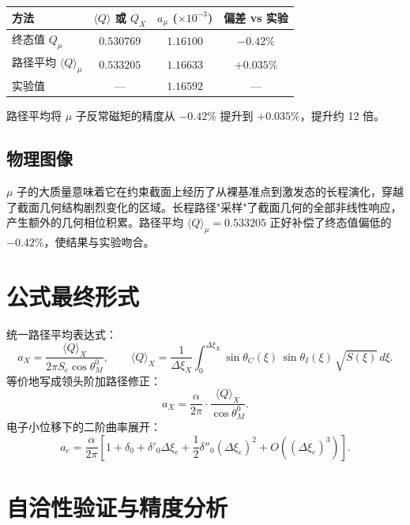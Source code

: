 \documentclass[12pt,a4paper]{article}
\theoremstyle{definition}
\begin{document}
\begin{center}
\begin{tabular}{@{}lccc@{}}
\toprule
方法 & $\langle Q\rangle$ 或 $Q_X$ & $a_\mu$ ($\times10^{-3}$) & 偏差 vs 实验 \\
\midrule
终态值 $Q_\mu$ & $0.530769$ & $1.16100$ & $-0.42\%$ \\
路径平均 $\langle Q\rangle_\mu$ & $0.533205$ & $1.16633$ & $\mathbf{+0.035\%}$ \\
实验值 & --- & $1.16592$ & --- \\
\bottomrule
\end{tabular}
\end{center}

路径平均将 $\mu$ 子反常磁矩的精度从 $-0.42\%$ 提升到 $+0.035\%$，提升约 12 倍。

\subsection{物理图像}

$\mu$ 子的大质量意味着它在约束截面上经历了从裸基准点到激发态的长程演化，穿越了截面几何结构剧烈变化的区域。长程路径"采样"了截面几何的全部非线性响应，产生额外的几何相位积累。路径平均 $\langle Q\rangle_\mu=0.533205$ 正好补偿了终态值偏低的 $-0.42\%$，使结果与实验吻合。

\section{公式最终形式}

统一路径平均表达式：
\begin{equation}
\boxed{a_X=\frac{\langle Q\rangle_X}{2\pi S_e\cos\theta_M^0},\qquad \langle Q\rangle_X=\frac{1}{\Delta\xi_X}\int_0^{\Delta\xi_X}\sin\theta_C(\xi)\,\sin\theta_I(\xi)\,\sqrt{S(\xi)}\,d\xi.}
\end{equation}
等价地写成领头阶加路径修正：
\begin{equation}
\boxed{a_X=\frac{\alpha}{2\pi}\cdot\frac{\langle Q\rangle_X}{\cos\theta_M^0}.}
\end{equation}
电子小位移下的二阶曲率展开：
\begin{equation}
\boxed{a_e=\frac{\alpha}{2\pi}\left[1+\delta_0+\delta'_0\Delta\xi_e+\frac{1}{2}\delta''_0(\Delta\xi_e)^2+O((\Delta\xi_e)^3)\right].}
\end{equation}

\section{自洽性验证与精度分析}
\end{document}
